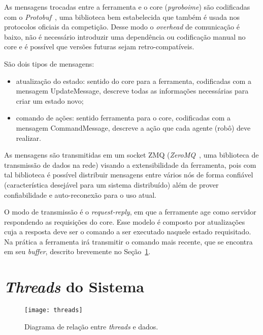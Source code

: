 As mensagens trocadas entre a ferramenta e o core (\textit{pyroboime}) são
codificadas com o \textit{Protobuf}~\cite{protobufdocs}, uma biblioteca bem
estabelecida que também é usada nos protocolos oficiais da competição.  Desse
modo o \textit{overhead} de comunicação é baixo, não é necessário introduzir uma
dependência ou codificação manual no core e é possível que versões futuras sejam
retro-compatíveis.

São dois tipos de mensagens:

\begin{itemize}
  \item atualização do estado: sentido do core para a ferramenta, codificadas
    com a mensagem UpdateMessage, descreve todas as informações necessárias para
    criar um estado novo;
  \item comando de ações: sentido ferramenta para o core, codificadas com a
    mensagem CommandMessage, descreve a ação que cada agente (robô) deve
    realizar.
\end{itemize}


As mensagens são transmitidas em um socket ZMQ (\textit{ZeroMQ}~\cite{zmqdocs},
uma biblioteca de transmissão de dados na rede) visando a extensibilidade da
ferramenta, pois com tal biblioteca é possível distribuir mensagens entre vários
nós de forma confiável (característica desejável para um sistema distribuído)
além de prover confiabilidade e auto-reconexão para o uso atual.

O modo de transmissão é o \textit{request-reply}, em que a ferramente age como
servidor respondendo as requisições do core. Esse modelo é composto por
atualizações cuja a resposta deve ser o comando a ser executado naquele estado
requisitado.  Na prática a ferramenta irá transmitir o comando mais recente,
que se encontra em seu \textit{buffer}, descrito brevemente no
Seção~\ref{sec:threads}.

\section{\textit{Threads} do Sistema}\label{sec:threads}

\begin{figure}[H]
  \centering
  \texttt{[image: threads]}
  \caption{Diagrama de relação entre \textit{threads} e
  dados.}\label{fig:arch_threads}
\end{figure}

